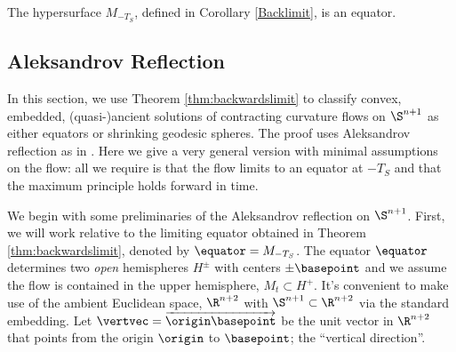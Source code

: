 \documentclass[12pt]{amsart}
\begin{document}

\begin{theorem}
\label{thm:backwardslimit}
The hypersurface $M_{-T_S}$, defined in Corollary \ref{Backlimit}, is an equator.
\end{theorem}



\subsection{Aleksandrov Reflection}

In this section, we use Theorem \ref{thm:backwardslimit} to classify convex, embedded, (quasi-)ancient solutions of contracting curvature flows on \(\S^{n+1}\) as either equators or shrinking geodesic spheres. The proof uses Aleksandrov reflection as in \cite{bryanlouie,2015arXiv150802821B}. Here we give a very general version with minimal assumptions on the flow: all we require is that the flow limits to an equator at $-T_S$ and that the maximum principle holds forward in time.

We begin with some preliminaries of the Aleksandrov reflection on \(\S^{n+1}\). First, we will work relative to the limiting equator obtained in Theorem \ref{thm:backwardslimit}, denoted by $\equator = M_{-T_S}$. The equator \(\equator\) determines two \emph{open} hemispheres \(H^{\pm}\) with centers \(\pm \basepoint\) and we assume the flow is contained in the upper hemisphere, $M_t \subset H^+$. It's convenient to make use of the ambient Euclidean space, \(\R^{n+2}\) with \(\S^{n+1} \subset \R^{n+2}\) via the standard embedding. Let \(\vertvec = \overrightarrow{\origin\basepoint}\) be the unit vector in \(\R^{n+2}\) that points from the origin \(\origin\) to \(\basepoint\); the ``vertical direction''. 
\end{document}
